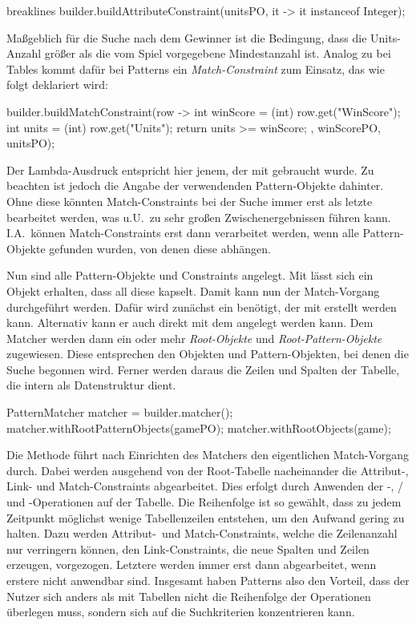 \begin{jcodeblock*}{breaklines}
    builder.buildAttributeConstraint(unitsPO, it -> it instanceof Integer);
\end{jcodeblock*}

Maßgeblich für die Suche nach dem Gewinner ist die Bedingung, dass die Units-Anzahl größer als die vom Spiel vorgegebene Mindestanzahl ist.
Analog zu  bei Tables kommt dafür bei Patterns ein \emph{Match-Constraint} zum Einsatz,
das wie folgt deklariert wird:

\begin{jcodeblock}
    builder.buildMatchConstraint(row -> {
        int winScore = (int) row.get("WinScore");
        int units = (int) row.get("Units");
        return units >= winScore;
    }, winScorePO, unitsPO);
\end{jcodeblock}

Der Lambda-Ausdruck entspricht hier jenem, der mit  gebraucht wurde.
Zu beachten ist jedoch die Angabe der verwendenden Pattern-Objekte dahinter.
Ohne diese könnten Match-Constraints bei der Suche immer erst als letzte bearbeitet werden,
was u.U.\ zu sehr großen Zwischenergebnissen führen kann.
I.A.\ können Match-Constraints erst dann verarbeitet werden, wenn alle Pattern-Objekte gefunden wurden,
von denen diese abhängen.

Nun sind alle Pattern-Objekte und Constraints angelegt.
Mit  lässt sich ein Objekt erhalten, dass all diese kapselt.
Damit kann nun der Match-Vorgang durchgeführt werden.
Dafür wird zunächst ein  benötigt, der mit  erstellt werden kann.
Alternativ kann er auch direkt mit dem  angelegt werden kann.
Dem Matcher werden dann ein oder mehr \emph{Root-Objekte} und \emph{Root-Pattern-Objekte} zugewiesen.
Diese entsprechen den Objekten und Pattern-Objekten, bei denen die Suche begonnen wird.
Ferner werden daraus die Zeilen und Spalten der Tabelle, die intern als Datenstruktur dient.

\begin{jcodeblock}
    PatternMatcher matcher = builder.matcher();
    matcher.withRootPatternObjects(gamePO);
    matcher.withRootObjects(game);
\end{jcodeblock}

Die Methode  führt nach Einrichten des Matchers den eigentlichen Match-Vorgang durch.
Dabei werden ausgehend von der Root-Tabelle nacheinander die Attribut-, Link- und Match-Constraints abgearbeitet.
Dies erfolgt durch Anwenden der -,  /  und -Operationen auf der Tabelle.
Die Reihenfolge ist so gewählt, dass zu jedem Zeitpunkt möglichst wenige Tabellenzeilen entstehen, um den Aufwand gering zu halten.
Dazu werden Attribut-\ und Match-Constraints, welche die Zeilenanzahl nur verringern können, den Link-Constraints, die neue Spalten und Zeilen erzeugen, vorgezogen.
Letztere werden immer erst dann abgearbeitet, wenn erstere nicht anwendbar sind.
Insgesamt haben Patterns also den Vorteil, dass der Nutzer sich anders als mit Tabellen nicht die Reihenfolge der Operationen überlegen muss, sondern sich auf die Suchkriterien konzentrieren kann.


